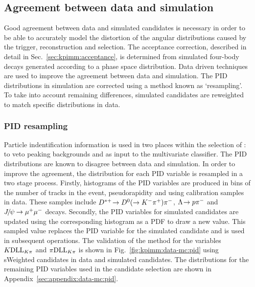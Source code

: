 \subsection{Agreement between data and simulation}
\label{sec:kpimm:data-mc}

Good agreement between data and simulated candidates is necessary in order to be able to accurately model the distortion of the angular distributions caused by the trigger, reconstruction and selection. The acceptance correction, described in detail in Sec.~\ref{sec:kpimm:acceptance}, is determined from simulated four-body \BdToKpimm decays generated according to a phase space distribution. Data driven techniques are used to improve the agreement between data and simulation. The PID distributions in simulation are corrected using a method known as `resampling'. To take into account remaining differences, simulated candidates are reweighted to match specific distributions in data.

\subsubsection{PID resampling}
\label{sec:kpimm:data-mc:resample}

Particle indentification information is used in two places within the selection of \BdToKpimm: to veto peaking backgrounds and as input to the multivariate classifier. The PID distributions are known to disagree between data and simulation. In order to improve the agreement, the distribution for each PID variable is resampled in a two stage process. Firstly, histograms of the PID variables are produced in bins of the number of tracks in the event, pseudorapidity and \pt using calibration samples in data. These samples include ${{D}^{*+}}\!\rightarrow {\ensuremath{{D}^0}}(\rightarrow{\ensuremath{{K}^-}}{\ensuremath{{\pi}^+}}){{\pi}^-}$, ${\Lambda}\!\rightarrow {\ensuremath{p}}{\ensuremath{{\pi}^-}}$ and ${{J\mskip -3mu/\mskip -2mu\psi\mskip 2mu}}\!\rightarrow {\ensuremath{\mu^+\mu^-}}$ decays. Secondly, the PID variables for simulated candidates are updated using the corresponding histogram as a PDF to draw a new value. This sampled value replaces the PID variable for the simulated candidate and is used in subsequent operations. The validation of the method for the variables ${K}\mathrm{DLL}_{{K}{\pi}}$ and ${\pi}\mathrm{DLL}_{{K}{\pi}}$ is shown in Fig.~\ref{fig:kpimm:data-mc:pid} using sWeighted \BdToJPsiKst candidates in data and simulated \BdToJPsiKst candidates. The distributions for the remaining PID variables used in the candidate selection are shown in Appendix~\ref{sec:appendix:data-mc:pid}.

